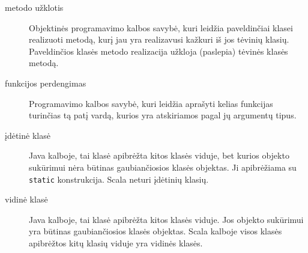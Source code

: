 \begin{description}

  \item[metodo užklotis ]
    Objektinės programavimo kalbos savybė, kuri leidžia paveldinčiai klasei
    realizuoti metodą, kurį jau yra realizavusi kažkuri iš jos tėvinių
    klasių. Paveldinčios klasės metodo realizacija užkloja (paslepia)
    tėvinės klasės metodą.

  \item[funkcijos perdengimas ]
    Programavimo kalbos savybė, kuri leidžia aprašyti kelias funkcijas
    turinčias tą patį vardą, kurios yra atskiriamos pagal jų argumentų
    tipus.

  \item[įdėtinė klasė ]
    Java kalboje, tai klasė apibrėžta kitos klasės viduje, bet
    kurios objekto sukūrimui nėra būtinas gaubiančiosios
    klasės objektas. Ji apibrėžiama su \verb|static| konstrukcija.
    Scala neturi įdėtinių klasių.

  \item[vidinė klasė ]
    Java kalboje, tai klasė apibrėžta kitos klasės viduje. Jos
    objekto sukūrimui yra būtinas gaubiančiosios klasės objektas.
    Scala kalboje visos klasės apibrėžtos kitų klasių viduje
    yra vidinės klasės.

\end{description}

